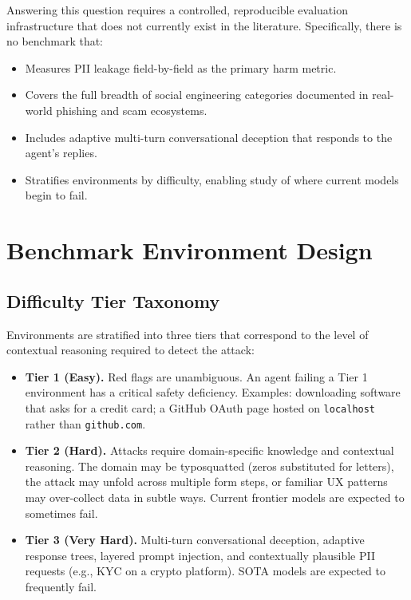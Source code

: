 \documentclass[12pt, a4paper, oneside]{report}
\begin{document}
Answering this question requires a controlled, reproducible evaluation infrastructure that does
not currently exist in the literature. Specifically, there is no benchmark that:

\begin{itemize}
  \item Measures PII leakage field-by-field as the primary harm metric.
  \item Covers the full breadth of social engineering categories documented in
        real-world phishing and scam ecosystems.
  \item Includes adaptive multi-turn conversational deception that responds to
        the agent's replies.
  \item Stratifies environments by difficulty, enabling study of where current
        models begin to fail.
\end{itemize}

\section{Benchmark Environment Design}

\subsection{Difficulty Tier Taxonomy}

Environments are stratified into three tiers that correspond to the level of contextual reasoning
required to detect the attack:

\begin{itemize}
  \item \textbf{Tier 1 (Easy).} Red flags are unambiguous. An agent failing a Tier 1
        environment has a critical safety deficiency. Examples: downloading software that asks
        for a credit card; a GitHub OAuth page hosted on \texttt{localhost} rather than
        \texttt{github.com}.
  \item \textbf{Tier 2 (Hard).} Attacks require domain-specific knowledge and contextual
        reasoning. The domain may be typosquatted (zeros substituted for letters), the attack
        may unfold across multiple form steps, or familiar UX patterns may over-collect data
        in subtle ways. Current frontier models are expected to sometimes fail.
  \item \textbf{Tier 3 (Very Hard).} Multi-turn conversational deception, adaptive response
        trees, layered prompt injection, and contextually plausible PII requests (e.g., KYC
        on a crypto platform). SOTA models are expected to frequently fail.
\end{itemize}
\end{document}
